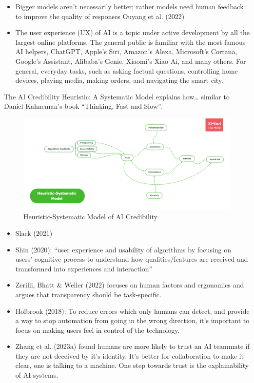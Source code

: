 \documentclass[
  letterpaper,
  DIV=11,
  numbers=noendperiod]{scrartcl}
\begin{document}
\begin{itemize}
\item
  Bigger models aren't necessarily better; rather models need human
  feedback to improve the quality of responses Ouyang et al. (2022)
\item
  The user experience (UX) of AI is a topic under active development by
  all the largest online platforms. The general public is familiar with
  the most famous AI helpers, ChatGPT, Apple's Siri, Amazon's Alexa,
  Microsoft's Cortana, Google's Assistant, Alibaba's Genie, Xiaomi's
  Xiao Ai, and many others. For general, everyday tasks, such as asking
  factual questions, controlling home devices, playing media, making
  orders, and navigating the smart city.
\end{itemize}

The AI Credibility Heuristic: A Systematic Model explains how\ldots{}
similar to Daniel Kahneman's book ``Thinking, Fast and Slow''.

\begin{figure}[H]

{\centering \includegraphics[width=1\linewidth,height=\textheight,keepaspectratio]{./images/ai/ai-credibility.png}

}

\caption{Heuristic-Systematic Model of AI Credibility}

\end{figure}%

\begin{itemize}
\item
  Slack (2021)
\item
  Shin (2020): ``user experience and usability of algorithms by focusing
  on users' cognitive process to understand how qualities/features are
  received and transformed into experiences and interaction''
\item
  Zerilli, Bhatt \& Weller (2022) focuses on human factors and
  ergonomics and argues that transparency should be task-specific.
\item
  Holbrook (2018): To reduce errors which only humans can detect, and
  provide a way to stop automation from going in the wrong direction,
  it's important to focus on making users feel in control of the
  technology.
\item
  Zhang et al. (2023a) found humans are more likely to trust an AI
  teammate if they are not deceived by it's identity. It's better for
  collaboration to make it clear, one is talking to a machine. One step
  towards trust is the explainability of AI-systems.
\end{itemize}
\end{document}
